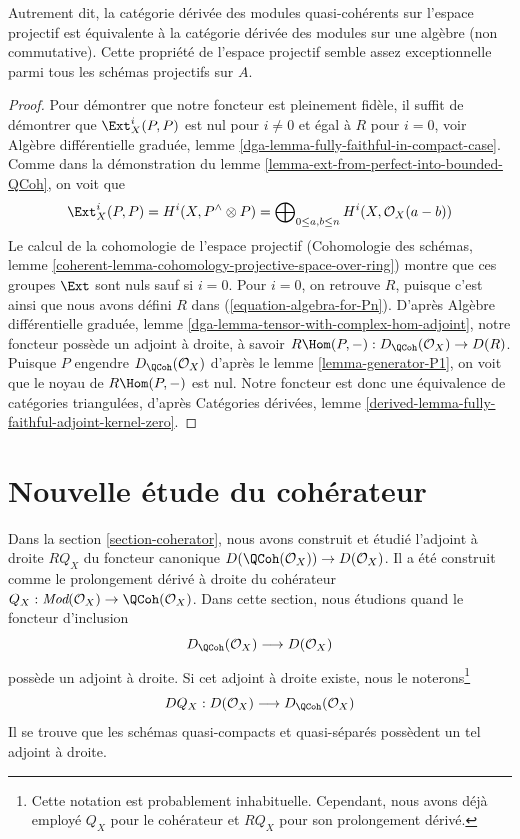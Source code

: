 \noindent
Autrement dit, la catégorie dérivée des modules quasi-cohérents sur
l'espace projectif est équivalente à la catégorie dérivée des modules
sur une algèbre (non commutative).
Cette propriété de l'espace projectif semble assez exceptionnelle parmi
tous les schémas projectifs sur $A$.

\begin{proof}
Pour démontrer que notre foncteur est pleinement fidèle, il suffit de démontrer
que $\Ext^i_X(P, P)$ est nul pour $i \not = 0$ et égal
à $R$ pour $i = 0$, voir
Algèbre différentielle graduée, lemme
\ref{dga-lemma-fully-faithful-in-compact-case}.
Comme dans la démonstration du
lemme \ref{lemma-ext-from-perfect-into-bounded-QCoh},
on voit que
$$
\Ext^i_X(P, P) = H^i(X, P^\wedge \otimes P) =
\bigoplus\nolimits_{0 \leq a, b \leq n} H^i(X, \mathcal{O}_X(a - b))
$$
Le calcul de la cohomologie de l'espace projectif
(Cohomologie des schémas, lemme
\ref{coherent-lemma-cohomology-projective-space-over-ring})
montre que
ces groupes $\Ext$ sont nuls sauf si $i = 0$.
Pour $i = 0$, on retrouve $R$, puisque c'est ainsi que nous avons défini $R$
dans (\ref{equation-algebra-for-Pn}).
D'après Algèbre différentielle graduée, lemme
\ref{dga-lemma-tensor-with-complex-hom-adjoint},
notre foncteur possède un adjoint à droite, à savoir
$R\Hom(P, -) : D_\QCoh(\mathcal{O}_X) \to D(R)$.
Puisque $P$ engendre $D_\QCoh(\mathcal{O}_X)$ d'après le
lemme \ref{lemma-generator-P1},
on voit que le noyau de $R\Hom(P, -)$ est nul.
Notre foncteur est donc une équivalence de catégories
triangulées, d'après Catégories dérivées, lemme
\ref{derived-lemma-fully-faithful-adjoint-kernel-zero}.
\end{proof}






\section{Nouvelle étude du cohérateur}
\label{section-better-coherator}

\noindent
Dans la section \ref{section-coherator}, nous avons construit et étudié
l'adjoint à droite $RQ_X$ du foncteur canonique
$D(\QCoh(\mathcal{O}_X)) \to D(\mathcal{O}_X)$.
Il a été construit comme le prolongement dérivé à droite du cohérateur
$Q_X : \textit{Mod}(\mathcal{O}_X) \to \QCoh(\mathcal{O}_X)$.
Dans cette section, nous étudions quand le foncteur d'inclusion
$$
D_\QCoh(\mathcal{O}_X) \longrightarrow D(\mathcal{O}_X)
$$
possède un adjoint à droite. Si cet adjoint à droite existe, nous le
noterons\footnote{Cette notation est probablement inhabituelle. Cependant, nous avons déjà
employé $Q_X$ pour le cohérateur et $RQ_X$ pour son prolongement dérivé.}
$$
DQ_X :
D(\mathcal{O}_X) \longrightarrow D_\QCoh(\mathcal{O}_X)
$$
Il se trouve que les schémas quasi-compacts et quasi-séparés
possèdent un tel adjoint à droite.

